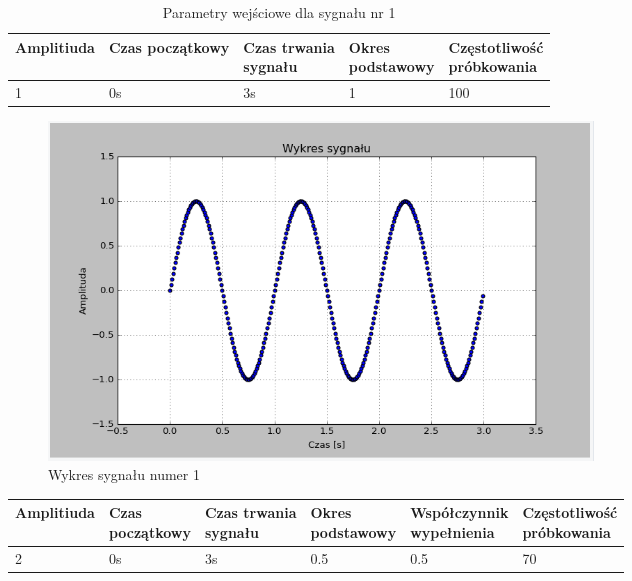 \documentclass{article}
\begin{document}
{{            \begin{table}[h!]
                \centering
                \begin{tabular}{|l|l|l|l|l|}
                    \hline
                    Amplitiuda & Czas początkowy & \shortstack{Czas trwania \\ sygnału} & \shortstack{Okres \\ podstawowy} & \shortstack{Częstotliwość\\ próbkowania}   \\ \hline
                    1 & 0s & 3s & 1 & 100           \\ \hline
                \end{tabular}
                \caption{Parametry wejściowe dla sygnału nr 1}
            \end{table}
            \FloatBarrier
            \begin{figure}[h!]
                \centering
                \includegraphics[width=0.7\textwidth]{img/splot1.png}
                \caption{Wykres sygnału numer 1}
            \end{figure}
            \FloatBarrier
            \begin{table}[h!]
                \centering
                \begin{tabular}{|l|l|l|l|l|l|}
                    \hline
                    Amplitiuda & \shortstack{Czas \\ początkowy} & \shortstack{Czas trwania \\ sygnału} & \shortstack{Okres \\ podstawowy} & \shortstack{Współczynnik\\ wypełnienia}  & \shortstack{Częstotliwość\\ próbkowania}   \\ \hline
                    2 & 0s & 3s & 0.5 & 0.5 & 70           \\ \hline
                \end{tabular}

\end{table}}}
\end{document}
